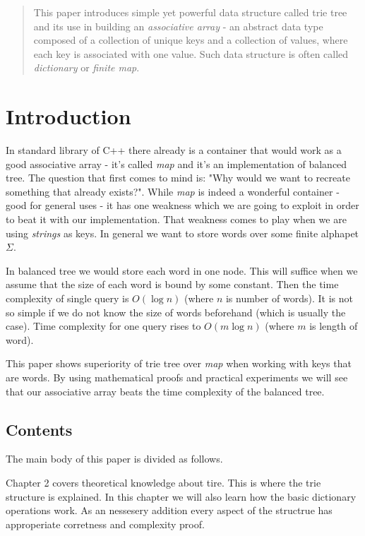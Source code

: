 \documentclass[a4paper,12pt]{article}
\newcommand\CC{\Lang{\mbox{C++}}\xspace}
\newcommand\Lang[1]{\textsc{#1}}
\begin{document}
\maketitle

\begin{abstract}
This paper introduces simple yet powerful data structure
    called trie tree and its use in building an \emph{associative array} - an
    abstract data type composed of a collection of unique keys and a
    collection of values, where each key is associated with one value.
Such data structure is often called \emph{dictionary} or \emph{finite map}.
\end{abstract}

\section{Introduction}
In standard library of \CC{} there already is a container that would work as a
    good associative array - it's called \emph{map} and it's an implementation 
    of balanced tree.
The question that first comes to mind is: "Why would we want
    to recreate something that already exists?".
While \emph{map} is indeed a wonderful container - good for general uses - it has one weakness
    which we are going to exploit in order to beat it with our implementation.
That weakness comes to play when we are using \emph{strings} as keys. 
In general we want to store words over some finite alphapet $\Sigma$.

In balanced tree we would store each word in one node. This will suffice when we assume that
the size of each word is bound by some constant. Then the time complexity of single query is
$O(\log n)$ (where $n$ is number of words). It is not so simple if we do not know the size of words beforehand
(which is usually the case). Time complexity for one query rises to $O(m\log n)$ (where $m$ is length of word).

This paper shows superiority of trie tree over \emph{map} when working with keys that are words. 
By using mathematical proofs and practical experiments we will see that our associative array 
beats the time complexity of the balanced tree.

\subsection{Contents}

The main body of this paper is divided as follows.

Chapter 2 covers theoretical knowledge about tire. This is where the trie structure is explained.
In this chapter we will also learn how the basic dictionary operations work.
As an nessesery addition every aspect of the structrue has approperiate corretness and complexity proof.
\end{document}
